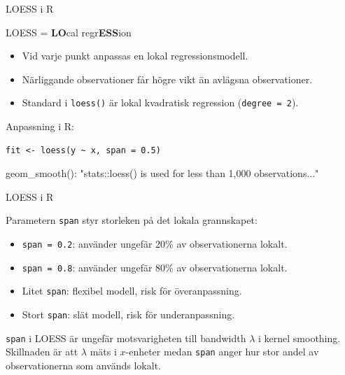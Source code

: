 \documentclass[10pt,english]{beamer}
\begin{document}
\begin{frame}[fragile]{LOESS i R}

    \begin{greenbox}
        LOESS = \textbf{LO}cal regr\textbf{ESS}ion
    \end{greenbox}

    \begin{itemize}
        \item Vid varje punkt anpassas en lokal regressionsmodell.
        \item Närliggande observationer får högre vikt än avlägsna observationer.
        \item Standard i \texttt{loess()} är lokal kvadratisk regression (\texttt{degree = 2}).
    \end{itemize}

    \medskip

    Anpassning i R:

\begin{verbatim}
fit <- loess(y ~ x, span = 0.5)
\end{verbatim}

    \medskip

    geom\_smooth(): "stats::loess() is used for less than 1,000 observations..."

\end{frame}




\begin{frame}[fragile]{LOESS i R}

    Parametern \texttt{span} styr storleken på det lokala grannskapet:

    \begin{itemize}
        \item \texttt{span = 0.2}: använder ungefär 20\% av observationerna lokalt.
        \item \texttt{span = 0.8}: använder ungefär 80\% av observationerna lokalt.
        \item Litet \texttt{span}: flexibel modell, risk för överanpassning.
        \item Stort \texttt{span}: slät modell, risk för underanpassning.
    \end{itemize}

\begin{greenbox}
    \texttt{span} i LOESS är ungefär motsvarigheten till bandwidth
    \(\lambda\) i kernel smoothing. Skillnaden är att \(\lambda\)
    mäts i \(x\)-enheter medan \texttt{span} anger hur stor andel av
    observationerna som används lokalt.
\end{greenbox}

\end{frame}
\end{document}
